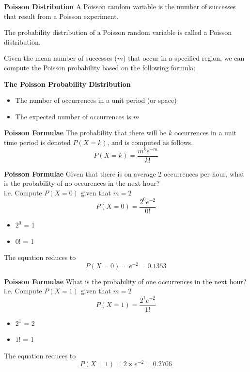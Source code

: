 

	
	{
		\textbf{Poisson Distribution}
		A Poisson random variable is the number of successes that result from a Poisson experiment.
		
		The probability distribution of a Poisson random variable is called a Poisson distribution.
		
		Given the mean number of successes ($m$) that occur in a specified region, we can compute the Poisson probability based on the following formula:
	}
	
	{
		\textbf{The Poisson Probability Distribution}
		\begin{itemize}
			\item The number of occurrences in a unit period (or space)
			\item The expected number of occurrences is $m$
		\end{itemize}
	}
	
	{
		\textbf{Poisson Formulae}
		The probability that there will be $k$ occurrences in a unit time period is denoted $P(X=k)$, and is computed as follows.
		\Large
		\[ P(X = k)=\frac{m^k e^{-m}}{k!} \]
		
	}
	{
		\textbf{Poisson Formulae}
		Given that there is on average 2 occurrences per hour, what is the probability of no occurences in the next hour? \\ i.e. Compute $P(X=0)$ given that $m=2$
		\Large
		\[ P(X = 0)=\frac{2^0 e^{-2}}{0!} \]
		\normalsize
		\begin{itemize}
			\item $2^0$ = 1
			\item $0!$ = 1
		\end{itemize}
		The equation reduces to
		\[ P(X = 0)=e^{-2} = 0.1353\]
	}
	{
		\textbf{Poisson Formulae}
		What is the probability of one occurrences in the next hour? \\ i.e. Compute $P(X=1)$ given that $m=2$
		\Large
		\[ P(X = 1)=\frac{2^1 e^{-2}}{1!} \]
		\normalsize
		\begin{itemize}
			\item $2^1$ = 2
			\item $1!$ = 1
		\end{itemize}
		The equation reduces to
		\[ P(X = 1) = 2 \times e^{-2} = 0.2706\]
	}
